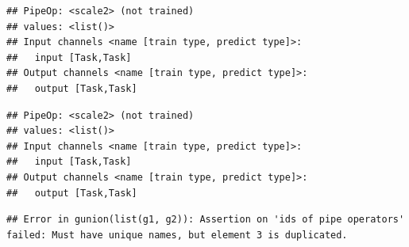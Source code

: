 \documentclass[]{article}
\newenvironment{Shaded}{\begin{snugshade}}{\end{snugshade}}
\newcommand{\DataTypeTok}[1]{\textcolor[rgb]{0.13,0.29,0.53}{#1}}
\newcommand{\KeywordTok}[1]{\textcolor[rgb]{0.13,0.29,0.53}{\textbf{#1}}}
\newcommand{\NormalTok}[1]{#1}
\newcommand{\OperatorTok}[1]{\textcolor[rgb]{0.81,0.36,0.00}{\textbf{#1}}}
\newcommand{\StringTok}[1]{\textcolor[rgb]{0.31,0.60,0.02}{#1}}
\renewenvironment{Shaded} {\begin{snugshade}\small} {\end{snugshade}}
\begin{document}
\begin{Shaded}
\end{Shaded}

\begin{verbatim}
## PipeOp: <scale2> (not trained)
## values: <list()>
## Input channels <name [train type, predict type]>:
##   input [Task,Task]
## Output channels <name [train type, predict type]>:
##   output [Task,Task]
\end{verbatim}

\begin{Shaded}
\end{Shaded}

\begin{verbatim}
## PipeOp: <scale2> (not trained)
## values: <list()>
## Input channels <name [train type, predict type]>:
##   input [Task,Task]
## Output channels <name [train type, predict type]>:
##   output [Task,Task]
\end{verbatim}

\begin{Shaded}
\end{Shaded}

\begin{verbatim}
## Error in gunion(list(g1, g2)): Assertion on 'ids of pipe operators' failed: Must have unique names, but element 3 is duplicated.
\end{verbatim}

\begin{Shaded}
\end{Shaded}
\end{document}
